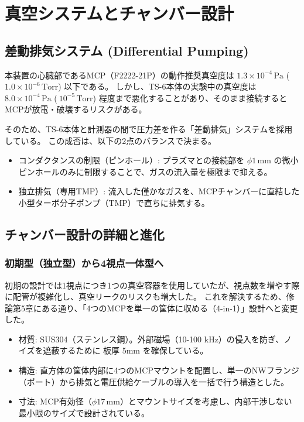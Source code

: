 \section{真空システムとチャンバー設計}

\subsection{差動排気システム (Differential Pumping)}
本装置の心臓部であるMCP（F2222-21P）の動作推奨真空度は $1.3 \times 10^{-4}\,\mathrm{Pa}$ ($1.0 \times 10^{-6}\,\mathrm{Torr}$) 以下である。
しかし、TS-6本体の実験中の真空度は $8.0 \times 10^{-4}\,\mathrm{Pa}$ ($~10^{-5}\,\mathrm{Torr}$) 程度まで悪化することがあり、そのまま接続するとMCPが放電・破壊するリスクがある\cite{Takeda2023}。

そのため、TS-6本体と計測器の間で圧力差を作る「差動排気」システムを採用している。
この成否は、以下の2点のバランスで決まる。
\begin{itemize}
    \item コンダクタンスの制限（ピンホール）:
    プラズマとの接続部を $\phi 1\,\mathrm{mm}$ の微小ピンホールのみに制限することで、ガスの流入量を極限まで抑える\cite{Xiang2021}。
    \item 独立排気（専用TMP）:
    流入した僅かなガスを、MCPチャンバーに直結した小型ターボ分子ポンプ（TMP）で直ちに排気する\cite{Takeda2023}。
\end{itemize}

\subsection{チャンバー設計の詳細と進化}
\subsubsection{初期型（独立型）から4視点一体型へ}
初期の設計では1視点につき1つの真空容器を使用していたが、視点数を増やす際に配管が複雑化し、真空リークのリスクも増大した。
これを解決するため、修論第5章にある通り、「4つのMCPを単一の筐体に収める（4-in-1）」設計へと変更した\cite{Takeda2023}。

\begin{itemize}
    \item 材質: SUS304（ステンレス鋼）。外部磁場（10-100 kHz）の侵入を防ぎ、ノイズを遮蔽するために 板厚 5mm を確保している\cite{Xiang2021}。
    \item 構造: 直方体の筐体内部に4つのMCPマウントを配置し、単一のNWフランジ（ポート）から排気と電圧供給ケーブルの導入を一括で行う構造とした\cite{Takeda2023}。
    \item 寸法: MCP有効径（$\phi 17\,\mathrm{mm}$）とマウントサイズを考慮し、内部干渉しない最小限のサイズで設計されている。
\end{itemize}

